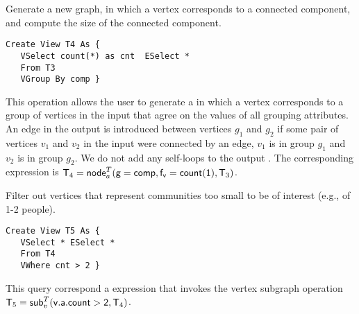 
\begin{example}
\label{ex:nodecra}

Generate a new graph, in which a vertex corresponds to a connected
component, and compute the size of the connected component.  

\begin{small} 
\begin{verbatim}
Create View T4 As { 
   VSelect count(*) as cnt  ESelect *
   From T3
   VGroup By comp }
\end{verbatim}
\end{small}

\end{example}

This operation allows the user to generate a \tg in which a vertex
corresponds to a group of vertices in the input that agree on the
values of all grouping attributes.  An edge in the output is
introduced between vertices $g_1$ and $g_2$ if some pair of vertices
$v_1$ and $v_2$ in the input \tg were connected by an edge, $v_1$ is
in group $g_1$ and $v_2$ is in group $g_2$.  We do not add any
self-loops to the output \tg. The corresponding \tra expression is
$\mathsf{T}_4 = \textsf{node}^T_a(\mathsf{g=comp,f_v=count(1)},\mathsf{T}_3)$.


\begin{example}
\label{ex:subg}

Filter out vertices that represent communities too small to be of
interest (e.g., of 1-2 people).  

\begin{small} 
\begin{verbatim}
Create View T5 As {
   VSelect * ESelect *
   From T4
   VWhere cnt > 2 }
\end{verbatim}
\end{small}

This query correspond a \tra expression that invokes the vertex
subgraph operation $\mathsf{T}_5 = \textsf{sub}^T_v(\mathsf{v.a.count > 2},\mathsf{T}_4)$.

\end{example}

